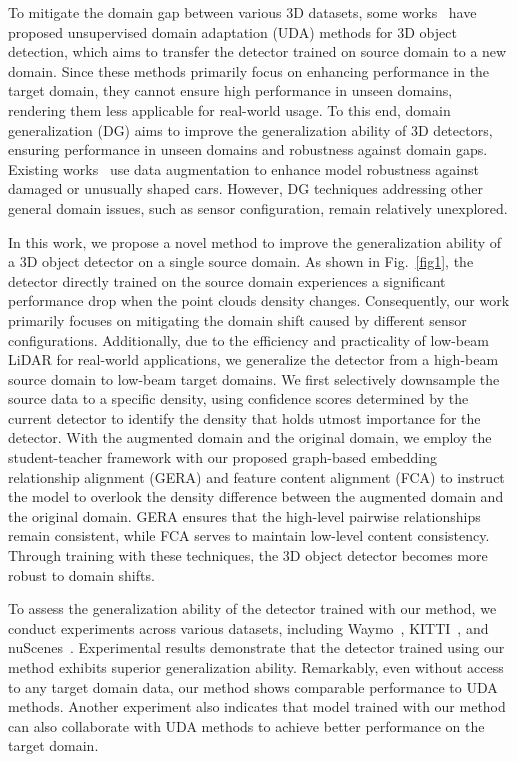 To mitigate the domain gap between various 3D datasets, some works~\cite{wang2020train, saltori2020sf, yang2021st3d, xu2021spg, yihan2021learning, wei2022lidar, hu2023density, tsai2023viewer} have proposed unsupervised domain adaptation (UDA) methods for 3D object detection, which aims to transfer the detector trained on source domain to a new domain. Since these methods primarily focus on enhancing performance in the target domain, they cannot ensure high performance in unseen domains, rendering them less applicable for real-world usage. To this end, domain generalization (DG) aims to improve the generalization ability of 3D detectors, ensuring performance in unseen domains and robustness against domain gaps. Existing works~\cite{lehner20223d} use data augmentation to enhance model robustness against damaged or unusually shaped cars. However, DG techniques addressing other general domain issues, such as sensor configuration, remain relatively unexplored.

In this work, we propose a novel method to improve the generalization ability of a 3D object detector on a single source domain. As shown in Fig.~\ref{fig1}, the detector directly trained on the source domain experiences a significant performance drop when the point clouds density changes. Consequently, our work primarily focuses on mitigating the domain shift caused by different sensor configurations. Additionally, due to the efficiency and practicality of low-beam LiDAR for real-world applications, we generalize the detector from a high-beam source domain to low-beam target domains. We first selectively downsample the source data to a specific density, using confidence scores determined by the current detector to identify the density that holds utmost importance for the detector. With the augmented domain and the original domain, we employ the student-teacher framework with our proposed graph-based embedding relationship alignment (GERA) and feature content alignment (FCA) to instruct the model to overlook the density difference between the augmented domain and the original domain. GERA ensures that the high-level pairwise relationships remain consistent, while FCA serves to maintain low-level content consistency. Through training with these techniques, the 3D object detector becomes more robust to domain shifts.

To assess the generalization ability of the detector trained with our method, we conduct experiments across various datasets, including Waymo~\cite{sun2020scalability}, KITTI~\cite{geiger2012we}, and nuScenes~\cite{caesar2020nuscenes}. Experimental results demonstrate that the detector trained using our method exhibits superior generalization ability. Remarkably, even without access to any target domain data, our method shows comparable performance to UDA methods. Another experiment also indicates that model trained with our method can also collaborate with UDA methods to achieve better performance on the target domain.

